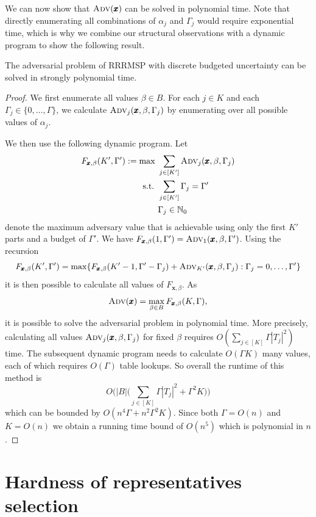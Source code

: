 We can now show that $\textsc{Adv}(\pmb{x})$ can be solved in polynomial time. Note that directly enumerating all combinations of $\alpha_j$ and $\Gamma_j$ would require exponential time, which is why we combine our structural observations with a dynamic program to show the following result.

\begin{theorem}\label{th:adv}
The adversarial problem of RRRMSP with discrete budgeted uncertainty can be solved in strongly polynomial time.
\end{theorem}
\begin{proof}
We first enumerate all values $\beta\in B$. For each $j\in K$ and each $\Gamma_j\in\{0,\ldots,\Gamma\}$,  we calculate $\textsc{Adv}_j(\pmb{x},\beta,\Gamma_j)$ by enumerating over all possible values of $\alpha_j$. 

We then use the following dynamic program. Let 
\begin{align*}
F_{\pmb{x},\beta}(K',\Gamma') := \max \ & \sum_{j\in[K']} \textsc{Adv}_j(\pmb{x},\beta,\Gamma_j) \\
\text{s.t. } & \sum_{j\in[K']} \Gamma_j = \Gamma' \\
& \Gamma_j \in \mathbb{N}_0
\end{align*}
denote the maximum adversary value that is achievable using only the first $K'$ parts and a budget of $\Gamma'$. We have $F_{\pmb{x},\beta}(1,\Gamma') = \textsc{Adv}_1(\pmb{x},\beta,\Gamma')$. Using the recursion
\[ F_{\pmb{x},\beta}(K',\Gamma') = \max\{ F_{\pmb{x},\beta}(K'-1,\Gamma'-\Gamma_j) + \textsc{Adv}_{K'}(\pmb{x},\beta,\Gamma_j) : \Gamma_j=0,\ldots,\Gamma'\} \]
it is then possible to calculate all values of $F_{\pmb{x},\beta}$. As
\[ \textsc{Adv}(\pmb{x}) = \max_{\beta\in B} F_{\pmb{x},\beta}(K,\Gamma), \]
it is possible to solve the adversarial problem in polynomial time. More precisely, calculating all values $\textsc{Adv}_j(\pmb{x},\beta,\Gamma_j)$ for fixed $\beta$ requires $O( \sum_{j\in[K]} \Gamma|T_j|^2)$ time. The subsequent dynamic program needs to calculate $O(\Gamma K)$ many values, each of which requires $O(\Gamma)$ table lookups. So overall the runtime of this method is
\[ O\Bigg(|B|\Big(\sum_{j\in[K]} \Gamma|T_j|^2 + \Gamma^2 K\Big) \Bigg) \]
which can be bounded by $O(n^4\Gamma + n^2 \Gamma^2 K )$. Since both $\Gamma = O(n)$ and $K = O(n)$
we obtain a running time bound of $O(n^5)$ which is polynomial in $n$.
\end{proof}




\section{Hardness of representatives selection}
\label{sec:hardness}

